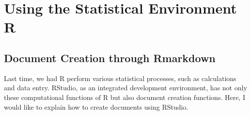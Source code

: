 \documentclass{ltjsbook}
\begin{document}
\VerbatimFootnotes
\chapter{Using the Statistical Environment R}
\label{m04_usingR}

\section{Document Creation through Rmarkdown}
\label{Rmarkdown}
Last time, we had R perform various statistical processes, such as calculations and data entry. RStudio, as an integrated development environment, has not only these computational functions of R but also document creation functions. Here, I would like to explain how to create documents using RStudio.
\end{document}
